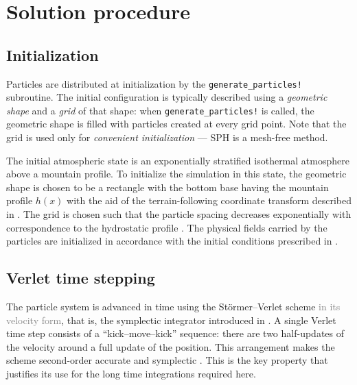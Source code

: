 \documentclass[../main.tex]{subfiles}
\begin{document}
\section{Solution procedure}
\label{sec:PROCEDURE}

\subsection{Initialization}
\label{sec:INITIALIZATION}
Particles are distributed at initialization by the \texttt{generate\_particles!} subroutine. The initial configuration is typically described using a \emph{geometric shape} and a \emph{grid} of that shape: when \texttt{generate\_particles!} is called, the geometric shape is filled with particles created at every grid point. Note that the grid is used only for \emph{convenient initialization} --- SPH is a mesh-free method.

The initial atmospheric state is an exponentially stratified isothermal atmosphere above a mountain profile. To initialize the simulation in this state, the geometric shape is chosen to be a rectangle with the bottom base having the mountain profile $h(x)$ with the aid of the terrain-following coordinate transform described in . The grid is chosen such that the particle spacing decreases exponentially with correspondence to the hydrostatic profile .
The physical fields carried by the particles are initialized in accordance with the initial conditions prescribed in .

\subsection{Verlet time stepping}
\label{sec:VERLET}

The particle system is advanced in time using the Störmer--Verlet scheme \textcolor{gray}{in its velocity form}, that is, the symplectic integrator introduced in . A single Verlet time step consists of a \enquote{kick--move--kick} sequence: there are two half-updates of the velocity around a full update of the position. This arrangement makes the scheme second-order accurate and symplectic \autocite{hairerGeometricNumericalIntegration2003}. This is the key property that justifies its use for the long time integrations required here.
\end{document}
